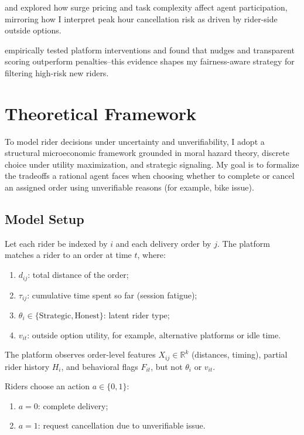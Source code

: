 \documentclass[12pt,letterpaper]{article}
\begin{document}
\citet{cachon2017surge} and \citet{besbes2021surge} explored how surge pricing and task complexity affect agent participation, mirroring how I interpret peak hour cancellation risk as driven by rider-side outside options.

\citet{zhang2023dispatch} empirically tested platform interventions and found that nudges and transparent scoring outperform penalties--this evidence shapes my fairness-aware strategy for filtering high-risk new riders.

\section{Theoretical Framework}

To model rider decisions under uncertainty and unverifiability, I adopt a structural microeconomic framework grounded in moral hazard theory, discrete choice under utility maximization, and strategic signaling. My goal is to formalize the tradeoffs a rational agent faces when choosing whether to complete or cancel an assigned order using unverifiable reasons (for example, bike issue).

\subsection{Model Setup}

Let each rider be indexed by $i$ and each delivery order by $j$. The platform matches a rider to an order at time $t$, where:
\begin{enumerate}
    \item $d_{ij}$: total distance of the order;
    \item $\tau_{ij}$: cumulative time spent so far (session fatigue);
    \item $\theta_i \in \{\text{Strategic}, \text{Honest}\}$: latent rider type;
    \item $v_{it}$: outside option utility, for example, alternative platforms or idle time.
\end{enumerate}

The platform observes order-level features $X_{ij} \in \mathbb{R}^k$ (distances, timing), partial rider history $H_i$, and behavioral flags $F_{it}$, but not $\theta_i$ or $v_{it}$.

Riders choose an action $a \in \{0, 1\}$:
\begin{enumerate}
    \item $a = 0$: complete delivery;
    \item $a = 1$: request cancellation due to unverifiable issue.
\end{enumerate}
\end{document}
